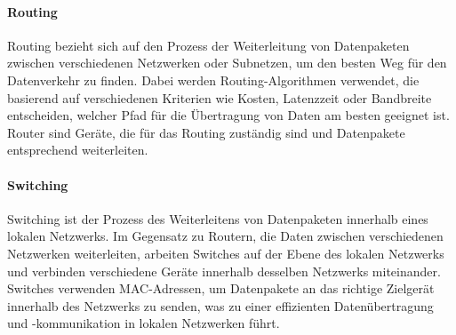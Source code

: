 \paragraph{Routing}

Routing bezieht sich auf den Prozess der Weiterleitung von Datenpaketen zwischen verschiedenen Netzwerken oder Subnetzen, um den besten Weg für den Datenverkehr zu finden. Dabei werden Routing-Algorithmen verwendet, die basierend auf verschiedenen Kriterien wie Kosten, Latenzzeit oder Bandbreite entscheiden, welcher Pfad für die Übertragung von Daten am besten geeignet ist. Router sind Geräte, die für das Routing zuständig sind und Datenpakete entsprechend weiterleiten.

\paragraph{Switching}

Switching ist der Prozess des Weiterleitens von Datenpaketen innerhalb eines lokalen Netzwerks. Im Gegensatz zu Routern, die Daten zwischen verschiedenen Netzwerken weiterleiten, arbeiten Switches auf der Ebene des lokalen Netzwerks und verbinden verschiedene Geräte innerhalb desselben Netzwerks miteinander. Switches verwenden MAC-Adressen, um Datenpakete an das richtige Zielgerät innerhalb des Netzwerks zu senden, was zu einer effizienten Datenübertragung und -kommunikation in lokalen Netzwerken führt.

\clearpage